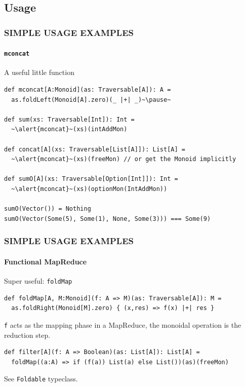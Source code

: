 \documentclass{beamer}
\begin{document}
\subsection{Usage}
\begin{frame}[fragile] \frametitle{SIMPLE USAGE EXAMPLES}
  \framesubtitle{\texttt{mconcat}}

  \begin{block}{A useful little function}
  \begin{lstlisting}
def mconcat[A:Monoid](as: Traversable[A]): A =
  as.foldLeft(Monoid[A].zero)(_ |+| _)~\pause~

def sum(xs: Traversable[Int]): Int =
  ~\alert{mconcat}~(xs)(intAddMon)

def concat[A](xs: Traversable[List[A]]): List[A] =
  ~\alert{mconcat}~(xs)(freeMon) // or get the Monoid implicitly

def sumO[A](xs: Traversable[Option[Int]]): Int =
  ~\alert{mconcat}~(xs)(optionMon(IntAddMon))

sumO(Vector()) = Nothing
sumO(Vector(Some(5), Some(1), None, Some(3))) === Some(9)
  \end{lstlisting}
  \end{block}



\end{frame}

\begin{frame}[fragile] \frametitle{SIMPLE USAGE EXAMPLES}
  \framesubtitle{Functional MapReduce}
  \begin{block}{Super useful: \texttt{foldMap}}
  \begin{lstlisting}
def foldMap[A, M:Monoid](f: A => M)(as: Traversable[A]): M =
  as.foldRight(Monoid[M].zero) { (x,res) => f(x) |+| res }
  \end{lstlisting}
  \end{block}

  \texttt{f} acts as the mapping phase in a MapReduce, the monoidal
  operation is the reduction step.

  \begin{block}{}
  \begin{lstlisting}
def filter[A](f: A => Boolean)(as: List[A]): List[A] =
  foldMap((a:A) => if (f(a)) List(a) else List())(as)(freeMon)
  \end{lstlisting}
  \end{block}


  See \texttt{Foldable} typeclass.
\end{frame}
\end{document}
